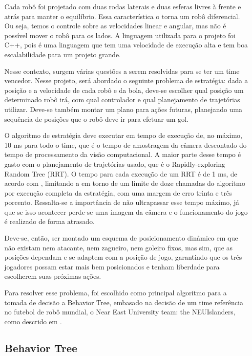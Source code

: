\documentclass[10pt,fleqn,a4paper]{article}
\begin{document}
Cada robô foi projetado com duas rodas laterais e duas esferas livres à frente e atrás para manter o equilíbrio. Essa característica o torna um robô diferencial. Ou seja, temos o controle sobre as velocidades linear e angular, mas não é possível mover o robô para os lados. A linguagem utilizada para o projeto foi C++, pois é uma linguagem que tem uma velocidade de execução alta e tem boa escalabilidade para um projeto grande. 

Nesse contexto, surgem várias questões a serem resolvidas para se ter um time vencedor. Nesse projeto, será abordado o seguinte problema de estratégia: dada a posição e a velocidade de cada robô e da bola, deve-se escolher qual posição um determinado robô irá, com qual controlador  e qual planejamento de trajetórias utilizar. Deve-se também montar um plano para ações futuras, planejando uma sequência de posições que o robô deve ir para efetuar um gol.

O algoritmo de estratégia deve executar em tempo de execução de, no máximo, 10 ms para todo o time, que é o tempo de amostragem da câmera descontado do tempo de processamento da visão computacional. A maior parte desse tempo é gasto com o planejamento de trajetórias usado, que é o Rapidly-exploring Random Tree (RRT). O tempo para cada execução de um RRT é de 1 ms, de acordo com \cite{franzoni_rrt}, limitando a em torno de um limite de doze chamadas do algoritmo por execução completa da estratégia, com uma margem de erro trinta e três porcento. Ressalta-se a importância de não ultrapassar esse tempo máximo, já que se isso acontecer perde-se uma imagem da câmera e o funcionamento do jogo é realizado de forma atrasado.

Deve-se, então, ser montado um esquema de posicionamento dinâmico em que não existam nem atacante, nem zagueiro, nem goleiro fixos, mas sim, que as posições dependam e se adaptem com a posição de jogo, garantindo que os três jogadores possam estar mais bem posicionados e tenham liberdade para escolherem suas próximas ações.

Para resolver esse problema, foi escolhido como principal algoritmo para a tomada de decisão a Behavior Tree, embasado na decisão de um time referência no futebol de robô mundial, o Near East University team: the NEUIslanders, como descrido em \cite{NEUIslanders_ssl}.

\subsection{Behavior Tree}
\end{document}
